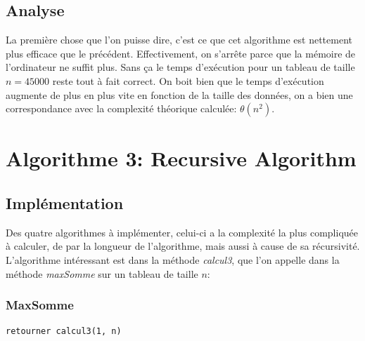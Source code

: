 \documentclass[a4paper, 12pt]{article}
\begin{document}
\subsection{Analyse}
La première chose que l'on puisse dire, c'est ce que cet algorithme est nettement plus efficace que le précédent. Effectivement, on s'arrête parce que la mémoire de l'ordinateur ne suffit plus. Sans ça le temps d’exécution pour un tableau de taille $n=45000$ reste tout à fait correct. On boit bien que le temps d’exécution augmente de plus en plus vite en fonction de la taille des données, on a bien une correspondance avec la complexité théorique calculée: $\theta(n^2)$.


\section{Algorithme 3: Recursive Algorithm}
\subsection{Implémentation}
Des quatre algorithmes à implémenter, celui-ci a la complexité la plus compliquée à calculer, de par la longueur de l'algorithme, mais aussi à cause de sa récursivité. L'algorithme intéressant est dans la méthode \emph{calcul3}, que l'on appelle dans la méthode \emph{maxSomme} sur un tableau de taille $n$:
\subsubsection{MaxSomme}
\begin{verbatim}
retourner calcul3(1, n)
\end{verbatim}
\end{document}
